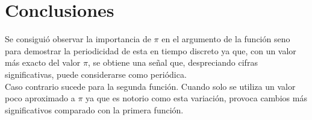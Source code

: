 \documentclass[12pt]{article}
\begin{document}
\section{Conclusiones}
Se consiguió observar la importancia de $\pi$ en el argumento de la función seno para demostrar la periodicidad de esta en tiempo discreto ya que, con un valor más exacto del valor $\pi$, se obtiene una señal que, despreciando cifras significativas, puede considerarse como periódica. 
\\
Caso contrario sucede para la segunda función. Cuando solo se utiliza un valor poco aproximado a $\pi$ ya que es notorio como esta variación, provoca cambios más significativos comparado con la primera función.


\end{document}
